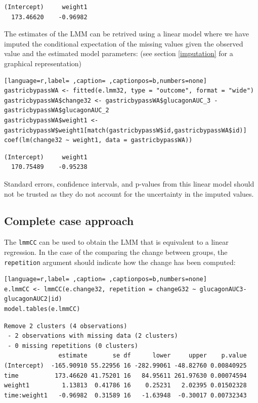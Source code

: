 \documentclass[12pt]{article}
\newcommand\Warning[1][3ex]{%
\renewcommand\stacktype{L}%
\scaleto{\stackon[1.3pt]{\color{red}$\triangle$}{\tiny\bfseries !}}{#1}%
\xspace
}
\begin{document}
\begin{verbatim}
(Intercept)     weight1 
  173.46620    -0.96982
\end{verbatim}


The estimates of the LMM can be retrived using a linear model where we
have imputed the conditional expectation of the missing values given
the observed value and the estimated model parameters: (see section
\ref{imputation} for a graphical representation)
\begin{lstlisting}[language=r,label= ,caption= ,captionpos=b,numbers=none]
gastricbypassWA <- fitted(e.lmm32, type = "outcome", format = "wide")
gastricbypassWA$change32 <- gastricbypassWA$glucagonAUC_3 - gastricbypassWA$glucagonAUC_2
gastricbypassWA$weight1 <- gastricbypassW$weight1[match(gastricbypassW$id,gastricbypassWA$id)]
coef(lm(change32 ~ weight1, data = gastricbypassWA))
\end{lstlisting}

\begin{verbatim}
(Intercept)     weight1 
  170.75489    -0.95238
\end{verbatim}



\Warning Standard errors, confidence intervals, and p-values from this
linear model should not be trusted as they do not account for the
uncertainty in the imputed values.

\subsection{Complete case approach}
\label{sec:orgccc6d90}

The \texttt{lmmCC} can be used to obtain the LMM that is equivalent to a
linear regression. In the case of the comparing the change between
groups, the \texttt{repetition} argument should indicate how the change has
been computed:
\begin{lstlisting}[language=r,label= ,caption= ,captionpos=b,numbers=none]
e.lmmCC <- lmmCC(e.change32, repetition = changeG32 ~ glucagonAUC3-glucagonAUC2|id)
model.tables(e.lmmCC)
\end{lstlisting}

\begin{verbatim}
Remove 2 clusters (4 observations) 
 - 2 observations with missing data (2 clusters) 
 - 0 missing repetitions (0 clusters)
               estimate       se df      lower     upper    p.value
(Intercept)  -165.90910 55.22956 16 -282.99061 -48.82760 0.00840925
time          173.46620 41.75201 16   84.95611 261.97630 0.00074594
weight1         1.13813  0.41786 16    0.25231   2.02395 0.01502328
time:weight1   -0.96982  0.31589 16   -1.63948  -0.30017 0.00732343
\end{verbatim}
\end{document}
